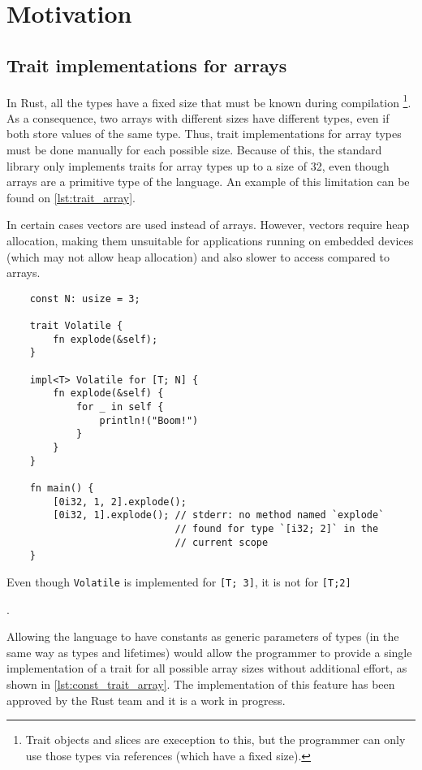 \chapter{Motivation}
\label{chapter:motivation}
\section{Trait implementations for arrays}
In Rust, all the types have a fixed size that must be known during compilation \footnote{Trait objects and slices are exeception to this, but the programmer can only use those types via references (which have a fixed size).}. As a consequence, two arrays with different sizes have different types, even if both store values of the same type. Thus, trait implementations for array types must be done manually for each possible size. Because of this, the standard library only implements traits for array types up to a size of 32, even though arrays are a primitive type of the language. An example of this limitation can be found on \ref{lst:trait_array}.

In certain cases vectors are used instead of arrays. However, vectors require heap allocation, making them unsuitable for applications running on embedded devices (which may not allow heap allocation) and also slower to access compared to arrays.

\begin{listing}
	\begin{verbatim} 
    const N: usize = 3;

    trait Volatile {
        fn explode(&self);
    }

    impl<T> Volatile for [T; N] {
        fn explode(&self) {
            for _ in self {
                println!("Boom!")
            }
        }
    }

    fn main() {
        [0i32, 1, 2].explode(); 
        [0i32, 1].explode(); // stderr: no method named `explode` 
                             // found for type `[i32; 2]` in the
                             // current scope
    }
	\end{verbatim}
    \caption{Even though \texttt{Volatile} is implemented for \texttt{[T; 3]}, it is not for \texttt{[T;2]}}.
  \label{lst:trait_array}
\end{listing}

Allowing the language to have constants as generic parameters of types (in the same way as types and lifetimes) would allow the programmer to provide a single implementation of a trait for all possible array sizes without additional effort, as shown in \ref{lst:const_trait_array}. The implementation of this feature has been approved by the Rust team and it is a work in progress.

